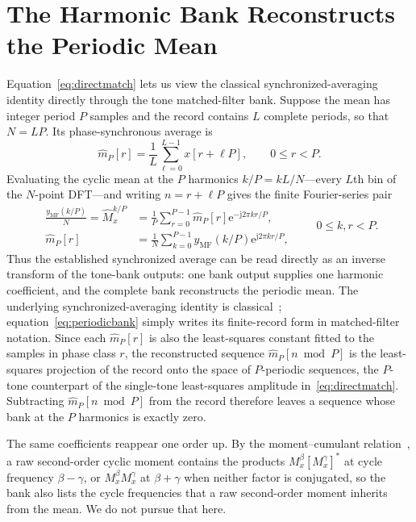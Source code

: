 \documentclass[11pt,draftcls,onecolumn,journal]{IEEEtran}
\newcommand{\ee}{\mathrm{e}}
\newcommand{\jj}{\mathrm{j}}
\begin{document}
\section*{The Harmonic Bank Reconstructs the Periodic Mean}

Equation~\eqref{eq:directmatch} lets us view the classical synchronized-averaging identity directly through the tone matched-filter bank.  Suppose the mean has integer period $P$ samples and the record contains $L$ complete periods, so that $N=LP$.  Its phase-synchronous average is
\begin{equation}
\widehat m_P[r]
=\frac{1}{L}\sum_{\ell=0}^{L-1}x[r+\ell P],
\qquad 0\leq r<P.
\label{eq:phaseaverage}
\end{equation}
Evaluating the cyclic mean at the $P$ harmonics $k/P=kL/N$---every $L$th bin of the $N$-point DFT---and writing $n=r+\ell P$ gives the finite Fourier-series pair
\begin{equation}
\begin{aligned}
\frac{y_{\mathrm{MF}}(k/P)}{N}
=\widehat M_x^{k/P}
&=\frac{1}{P}\sum_{r=0}^{P-1}
\widehat m_P[r]\ee^{-\jj2\pi kr/P},\\
\widehat m_P[r]
&=\frac{1}{N}\sum_{k=0}^{P-1}
y_{\mathrm{MF}}(k/P)\ee^{\jj2\pi kr/P},
\end{aligned}
\qquad 0\leq k,r<P.
\label{eq:periodicbank}
\end{equation}
Thus the established synchronized average can be read directly as an inverse transform of the tone-bank outputs: one bank output supplies one harmonic coefficient, and the complete bank reconstructs the periodic mean.  The underlying synchronized-averaging identity is classical~\cite[eq. (23)]{gardner1986}; equation~\eqref{eq:periodicbank} simply writes its finite-record form in matched-filter notation.  Since each $\widehat m_P[r]$ is also the least-squares constant fitted to the samples in phase class $r$, the reconstructed sequence $\widehat m_P[n\bmod P]$ is the least-squares projection of the record onto the space of $P$-periodic sequences, the $P$-tone counterpart of the single-tone least-squares amplitude in~\eqref{eq:directmatch}.  Subtracting $\widehat m_P[n\bmod P]$ from the record therefore leaves a sequence whose bank at the $P$ harmonics is exactly zero.

The same coefficients reappear one order up.  By the moment--cumulant relation~\cite[eq. (13.12)]{gardner2006}, a raw second-order cyclic moment contains the products $M_x^{\beta}[M_x^{\gamma}]^*$ at cycle frequency $\beta-\gamma$, or $M_x^{\beta}M_x^{\gamma}$ at $\beta+\gamma$ when neither factor is conjugated, so the bank also lists the cycle frequencies that a raw second-order moment inherits from the mean.  We do not pursue that here.
\end{document}
